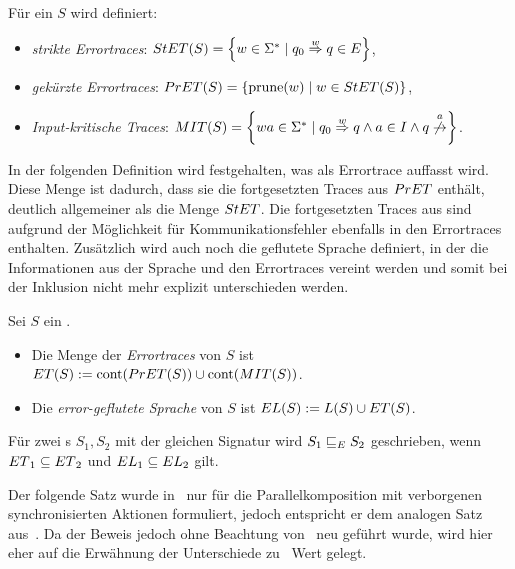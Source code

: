 \begin{Def}[Errortraces]
\label{DefErrortraces}
  Für ein \EIO{} $S$ wird definiert:
  \begin{itemize}
    \item \emph{strikte Errortraces}: $StET{}(S)=\left\{w\in\Sigma
      ^*\mid q_0\overset{w}{\Rightarrow}q\in E\right\}$,
    \item \emph{gekürzte Errortraces}: $PrET{}(S)=\left\{\mathrm{prune}{}(w)\mid w\in
      StET{}(S)\right\}$,
    \item \emph{Input-kritische Traces}: $\MIT{}(S)=\left\{wa\in\Sigma ^*\mid
      q_0\overset{w}{\Rightarrow}q\wedge a\in I\wedge
    q\overset{a}{\not{\hspace{-0.1cm}\rightarrow}}\right\}$.
  \end{itemize}
\end{Def}

In der folgenden Definition wird festgehalten, was als Errortrace auffasst
wird. Diese Menge ist dadurch, dass sie die fortgesetzten Traces aus $PrET{}$
enthält, deutlich allgemeiner als die Menge $StET{}$. Die fortgesetzten Traces
aus \MIT{} sind aufgrund der Möglichkeit für Kommunikationsfehler ebenfalls in
den Errortraces enthalten. Zusätzlich wird auch noch
die geflutete Sprache definiert, in der die Informationen aus der Sprache und den
Errortraces vereint werden und somit bei der Inklusion nicht mehr explizit
unterschieden werden.

\begin{Def}
\label{DefETEL}
  Sei $S$ ein \EIO{}.
  \begin{itemize}
    \item Die Menge der \emph{Errortraces} von $S$ ist $ET{}(S):=\mathrm{cont}{}(PrET{}(S))\cup
      \mathrm{cont}{}(MIT{}(S))$.
    \item Die \emph{error-geflutete Sprache} von $S$ ist $EL{}(S):=L(S)\cup ET{}(S)$.
  \end{itemize}
  Für zwei \EIO{}s $S_1, S_2$ mit der gleichen Signatur wird
  $S_1\sqsubseteq _E S_2$ geschrieben, wenn $ET{}_1\subseteq ET{}_2$ und
  $EL{}_1\subseteq EL{}_2$ gilt.
\end{Def}

Der folgende Satz wurde in~\cite{Vogler2014EIO} nur für die Parallelkomposition
mit verborgenen synchronisierten Aktionen formuliert, jedoch entspricht er dem
analogen Satz aus~\cite{Schlosser2012BA}. Da der Beweis jedoch ohne Beachtung
von~\cite{Schlosser2012BA} neu geführt wurde, wird hier eher auf die
Erwähnung der Unterschiede zu~\cite{Vogler2014EIO} Wert gelegt.

